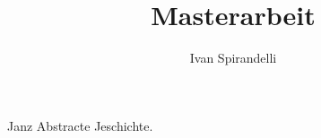 \documentclass[a4paper, 11pt,openany,oneside]{scrbook}
\title{Masterarbeit}
\author{Ivan Spirandelli}
\newenvironment{abstract}{\cleardoublepage \null \vfill \begin{center} \bfseries \abstractname \end{center}}{\vfill \null}
\theoremstyle{definition}
\theoremstyle{plain}
\begin{document}


\newpage
\thispagestyle{empty}
\qquad
\begin{abstract}
Janz Abstracte  Jeschichte.
\end{abstract}
\newpage
\thispagestyle{empty}
\qquad

\tableofcontents
\newpage
\thispagestyle{empty}
\qquad


\newpage

\qquad
%
\newpage

\qquad
%






\newpage
\backmatter


\end{document}
